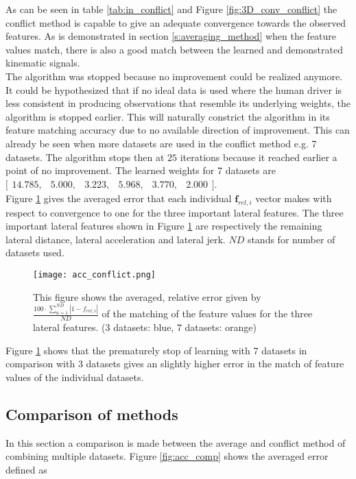 As can be seen in table \ref{tab:in_conflict} and Figure \ref{fig:3D_conv_conflict} the conflict method is capable to give an adequate convergence towards the observed features. As is demonstrated in section \ref{s:averaging_method} when the feature values match, there is also a good match between the learned and demonstrated kinematic signals.\\
The algorithm was stopped because no improvement could be realized anymore. It could be hypothesized that if no ideal data is used where the human driver is less consistent in producing observations that resemble its underlying weights, the algorithm is stopped earlier. This will naturally constrict the algorithm in its feature matching accuracy due to no available direction of improvement. This can already be seen when more datasets are used in the conflict method e.g. 7 datasets. The algorithm stops then at $25$ iterations because it reached earlier a point of no improvement. The learned weights for 7 datasets are $\bigl[ \begin{smallmatrix} 14.785,&5.000,&3.223,&5.968,&3.770,&2.000\end{smallmatrix}\bigr]$. \\
Figure \ref{fig:acc_conflict} gives the averaged error that each individual $\bm{f}_{rel,i}$ vector makes with respect to convergence to one for the three important lateral features. The three important lateral features shown in Figure \ref{fig:acc_conflict} are respectively the remaining lateral distance, lateral acceleration and lateral jerk. $ND$ stands for number of datasets used.

\begin{figure}[h!]
	\centering
	\texttt{[image: acc\_conflict.png]}
	\caption{This figure shows the averaged, relative error given by $\frac{100\cdot\sum_{n=1}^{ND}|1-f_{rel,i}|}{ND}$ of the matching of the feature values for the three lateral features. (3 datasets: blue, 7 datasets: orange)}
	\label{fig:acc_conflict}
\end{figure}

Figure \ref{fig:acc_conflict} shows that the prematurely stop of learning with 7 datasets in comparison with 3 datasets gives an slightly higher error in the match of feature values of the individual datasets.    
 
\subsection{Comparison of methods}\label{s:comparison of methods}
In this section a comparison is made between the average and conflict method of combining multiple datasets. Figure \ref{fig:acc_comp} shows the averaged error defined as 

